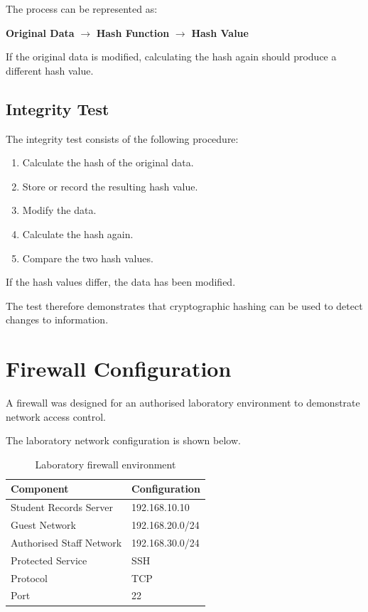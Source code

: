 \documentclass[12pt,a4paper]{article}
\begin{document}
The process can be represented as:

\begin{center}
\textbf{Original Data}
$\rightarrow$
\textbf{Hash Function}
$\rightarrow$
\textbf{Hash Value}
\end{center}

If the original data is modified, calculating the hash again should
produce a different hash value.

\subsection{Integrity Test}

The integrity test consists of the following procedure:

\begin{enumerate}
    \item Calculate the hash of the original data.
    \item Store or record the resulting hash value.
    \item Modify the data.
    \item Calculate the hash again.
    \item Compare the two hash values.
\end{enumerate}

If the hash values differ, the data has been modified.

The test therefore demonstrates that cryptographic hashing can be used
to detect changes to information.

\section{Firewall Configuration}

A firewall was designed for an authorised laboratory environment to
demonstrate network access control.

The laboratory network configuration is shown below.

\begin{table}[h]
\centering
\begin{tabular}{ll}
\toprule
\textbf{Component} & \textbf{Configuration} \\
\midrule
Student Records Server & 192.168.10.10 \\
Guest Network & 192.168.20.0/24 \\
Authorised Staff Network & 192.168.30.0/24 \\
Protected Service & SSH \\
Protocol & TCP \\
Port & 22 \\
\bottomrule
\end{tabular}
\caption{Laboratory firewall environment}
\end{table}
\end{document}
